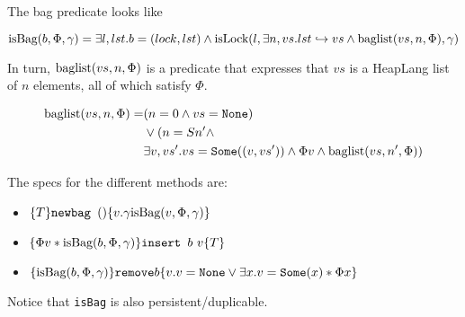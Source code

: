 The bag predicate looks like

\[ \text{isBag}{(b, \Phi, \gamma)}  = \exists l, lst. b = (lock, lst) \land \text{isLock}{(l, \exists n, vs. lst \hookrightarrow vs \land \text{baglist}(vs, n, \Phi), \gamma)}  \]

In turn, $\text{baglist}(vs, n, \Phi)$ is a predicate that expresses that $vs$ is a HeapLang list of $n$ elements, all of which satisfy $\Phi$.

\begin{align*}
\text{baglist}(vs, n, \Phi) =& (n = 0 \land vs = \texttt{None}) \\
& \lor (n = S n' \land \\
& \exists v, vs'. vs = \texttt{Some}((v, vs')) \land \Phi v \land \text{baglist}(vs, n', \Phi) ) 
\end{align*}


The specs for the different methods are:
\begin{itemize}

\item $\{T\} \texttt{newbag } () \{v. \gamma \text{isBag}{(v, \Phi, \gamma)}\}$

\item $\{\Phi v * \text{isBag}{(b, \Phi, \gamma)}\} \texttt{insert } b \text{ } v \{T\}$

\item $\{\text{isBag}{(b, \Phi, \gamma)}\} \texttt{remove} b \{v. v = \texttt{None} \lor \exists x. v = \texttt{Some}(x) * \Phi x\}$

\end{itemize}

Notice that \texttt{isBag} is also persistent/duplicable.


